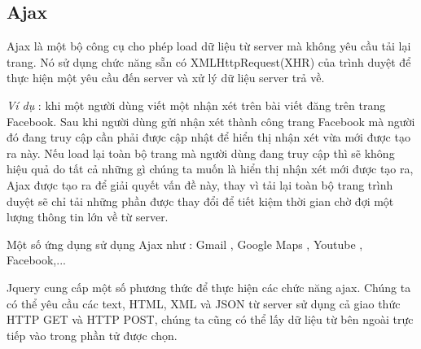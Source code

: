 \subsection{Ajax}
Ajax là một bộ công cụ cho phép load dữ liệu từ server mà không yêu cầu tải lại trang. Nó sử dụng chức năng sẵn có XMLHttpRequest(XHR) của trình duyệt để thực hiện một yêu cầu đến server và xử lý dữ liệu server trả về.
\par
\textit{Ví dụ} : khi một người dùng viết một nhận xét trên bài viết đăng trên trang Facebook. Sau khi người dùng gửi nhận xét thành công trang Facebook mà người đó đang truy cập cần phải được cập nhật để hiển thị nhận xét vừa mới được tạo ra này. Nếu load lại toàn bộ trang mà người dùng đang truy cập thì sẽ không hiệu quả do tất cả những gì chúng ta muốn là hiển thị nhận xét mới được tạo ra, Ajax được tạo ra để giải quyết vấn đề này, thay vì tải lại toàn bộ trang trình duyệt sẽ chỉ tải những phần được thay đổi để tiết kiệm thời gian chờ đợi một lượng thông tin lớn về từ server.\par
Một số ứng dụng sử dụng Ajax như : Gmail , Google Maps , Youtube , Facebook,...\par
Jquery cung cấp một số phương thức để thực hiện các chức năng ajax. Chúng ta có thể yêu cầu các text, HTML, XML và JSON từ server sử dụng cả giao thức HTTP GET và HTTP POST, chúng ta cũng có thể lấy dữ liệu từ bên ngoài trực tiếp vào trong phần tử được chọn.
